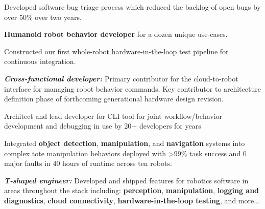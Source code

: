 \begin{cventries}
{\begin{cvitems}
        \item{Developed  software bug triage process which reduced the backlog of open bugs by over 50\% over two years.}
        \item{\textbf{Humanoid robot behavior developer} for a dozen unique use-cases.}
        \item{Constructed our first whole-robot hardware-in-the-loop test pipeline for continuous integration.}
        \item{\textbf{\textit{Cross-functional developer:}} Primary contributor for the cloud-to-robot interface for managing robot behavior commands. Key contributor to architecture definition phase of forthcoming generational hardware design revision.}
        \item{Architect and lead developer for  CLI tool for joint workflow/behavior development and debugging in use by 20+ developers for years}
        \item{Integrated \textbf{object detection}, \textbf{manipulation}, and \textbf{navigation} systems into complex tote manipulation behaviors deployed with >99\% task success and 0 major faults in 40 hours of runtime across ten robots.}
        \item{\textbf{\textit{T-shaped engineer:}} Developed and shipped features for robotics software in areas throughout the stack including: \textbf{perception}, \textbf{manipulation}, \textbf{logging and diagnostics}, \textbf{cloud connectivity}, \textbf{hardware-in-the-loop testing}, and more...}
      \end{cvitems}
    }

\vspace{2mm}


\end{cventries}
